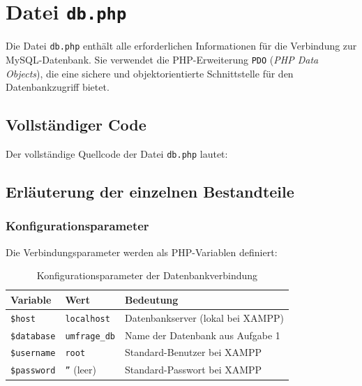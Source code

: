 \section{Datei \texttt{db.php}}

Die Datei \texttt{db.php} enthält alle erforderlichen Informationen für die Verbindung zur My\acs{SQL}-Datenbank. Sie verwendet die \acs{PHP}-Erweiterung \texttt{PDO} (\textit{\acs{PHP} Data Objects}), die eine sichere und objektorientierte Schnittstelle für den Datenbankzugriff bietet.

\subsection{Vollständiger Code}

Der vollständige Quellcode der Datei \texttt{db.php} lautet:



\subsection{Erläuterung der einzelnen Bestandteile}

\subsubsection{Konfigurationsparameter}

Die Verbindungsparameter werden als \acs{PHP}-Variablen definiert:

\begin{table}[h]
\centering
\begin{tabular}{|l|l|l|}
\hline
\textbf{Variable} & \textbf{Wert} & \textbf{Bedeutung} \\
\hline
\texttt{\$host} & \texttt{localhost} & Datenbankserver (lokal bei \acs{XAMPP}) \\
\texttt{\$database} & \texttt{umfrage\_db} & Name der Datenbank aus Aufgabe 1 \\
\texttt{\$username} & \texttt{root} & Standard-Benutzer bei \acs{XAMPP} \\
\texttt{\$password} & \texttt{''} (leer) & Standard-Passwort bei \acs{XAMPP} \\
\hline
\end{tabular}
\caption{Konfigurationsparameter der Datenbankverbindung}
\label{tab:db-config}
\end{table}

